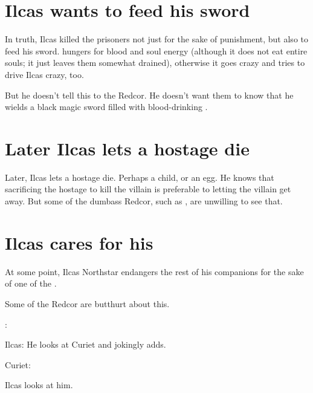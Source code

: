 \section{Ilcas wants to feed his sword}
In truth, Ilcas killed the prisoners not just for the sake of punishment, but also to feed his sword. 
\Telderain{} hungers for blood and soul energy (although it does not eat entire souls; it just leaves them somewhat drained), otherwise it goes crazy and tries to drive Ilcas crazy, too.  

But he doesn't tell this to the Redcor. 
He doesn't want them to know that he wields a black magic sword filled with blood-drinking \daemons. 





\section{Later Ilcas lets a hostage die}
Later, Ilcas lets a hostage die. 
Perhaps a child, or an egg. 
He knows that sacrificing the hostage to kill the villain is preferable to letting the villain get away. 
But some of the dumbass Redcor, such as \Racel, are unwilling to see that. 





\section{Ilcas cares for his \nycans}
At some point, Ilcas Northstar endangers the rest of his companions for the sake of one of the \nycans. 

Some of the Redcor are butthurt about this.

\begin{prose}
  \Esmerel: 
  
  Ilcas: 
  He looks at Curiet and jokingly adds.
  
  Curiet:
  
  Ilcas looks at him.
\end{prose}









